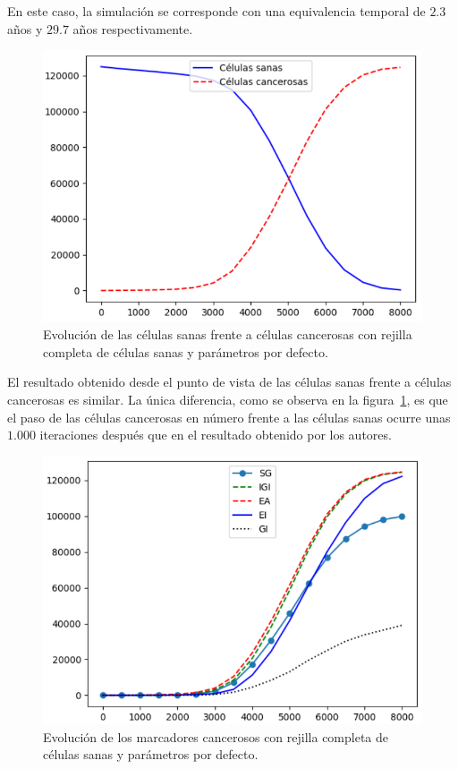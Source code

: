 En este caso, la simulación se corresponde con una equivalencia temporal
de $2.3$ años y $29.7$ años respectivamente.

\begin{figure}[h]
\centering
\includegraphics[scale=0.8]{figures/experiments/exp5/healthvscarcino}
\caption{Evolución de las células sanas frente a células cancerosas con rejilla completa de células sanas y parámetros por defecto.}
\label{fig:ownexp5-1}
\end{figure}

El resultado obtenido desde el punto de vista de las células sanas frente a células cancerosas
es similar. La única diferencia, como se observa en la figura~\ref{fig:ownexp5-1}, es
que el paso de las células cancerosas en número frente a las células sanas ocurre unas
$1.000$ iteraciones después que en el resultado obtenido por los autores.

\begin{figure}[h]
\centering
\includegraphics[scale=0.8]{figures/experiments/exp5/mutations}
\caption{Evolución de los marcadores cancerosos con rejilla completa de células sanas y parámetros por defecto.}
\label{fig:ownexp5-2}
\end{figure}

